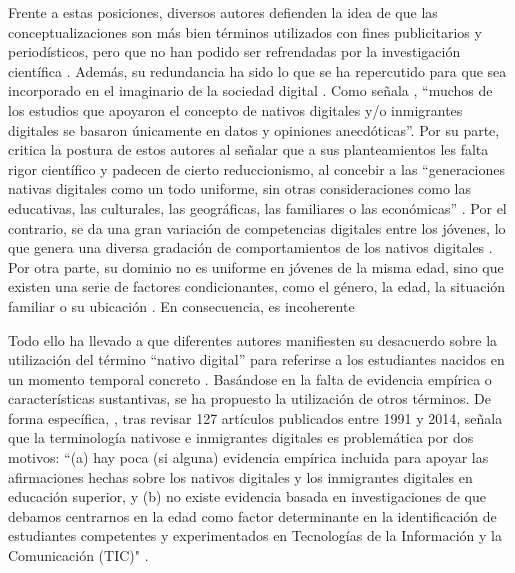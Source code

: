 \documentclass[spanish]{textolivre}
\begin{document}
Frente a estas posiciones, diversos autores defienden la idea de que las conceptualizaciones son más bien términos utilizados con fines publicitarios y periodísticos, pero que no han podido ser refrendadas por la investigación científica \cite{ecdlfo, creighton2018digital, granado_palma_educacion_2019, desmurget_fabrica_2020}. Además, su redundancia ha sido lo que se ha repercutido para que sea incorporado en el imaginario de la sociedad digital \cite{masgarcia2018tejido}. Como señala \textcite[p. 134]{creighton2018digital}, “muchos de los estudios que apoyaron el concepto de nativos digitales y/o inmigrantes digitales se basaron únicamente en datos y opiniones anecdóticas”. Por su parte, \textcite{granado_palma_educacion_2019} critica la postura de estos autores al señalar que a sus planteamientos les falta rigor científico y padecen de cierto reduccionismo, al concebir a las “generaciones nativas digitales como un todo uniforme, sin otras consideraciones como las educativas, las culturales, las geográficas, las familiares o las económicas” \cite[p. 32]{granado_palma_educacion_2019}. Por el contrario, se da una gran variación de competencias digitales entre los jóvenes, lo que genera una diversa gradación de comportamientos de los nativos digitales \cite{acostasilva_tras_2017, humanante2019competencias}. Por otra parte, su dominio no es uniforme en jóvenes de la misma edad, sino que existen una serie de factores condicionantes, como el género, la edad, la situación familiar o su ubicación \cite{owens_influence_2017, padilla2016inclusion, romero-tena_challenge_2020, casillas-martin_modelos_2021}. En consecuencia, es incoherente

Todo ello ha llevado a que diferentes autores manifiesten su desacuerdo sobre la utilización del término “nativo digital” para referirse a los estudiantes nacidos en un momento temporal concreto \cite{prensky_ensenar_2011}. Basándose en la falta de evidencia empírica o características sustantivas, se ha propuesto la utilización de otros términos. De forma específica, \textcite{creighton2018digital}, tras revisar 127 artículos publicados entre 1991 y 2014, señala que la terminología nativose e inmigrantes digitales es problemática por dos motivos: “(a) hay poca (si alguna) evidencia empírica incluida para apoyar las afirmaciones hechas sobre los nativos digitales y los inmigrantes digitales en educación superior, y (b) no existe evidencia basada en investigaciones de que debamos centrarnos en la edad como factor determinante en la identificación de estudiantes competentes y experimentados en Tecnologías de la Información y la Comunicación (TIC)" \cite[p. 137]{creighton2018digital}.
\end{document}
